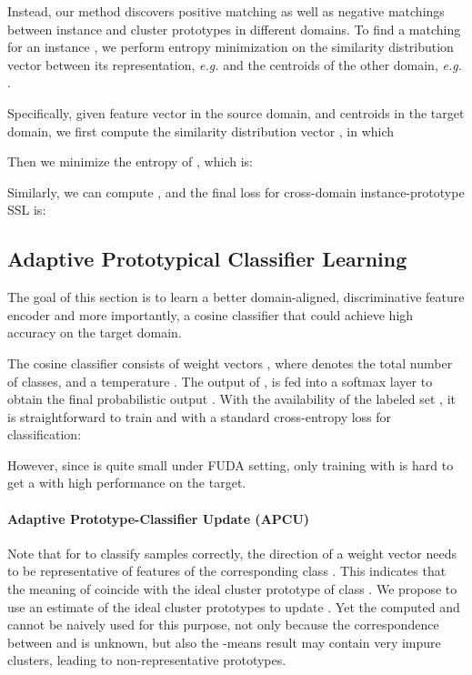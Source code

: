 \documentclass[final]{cvpr}
\begin{document}
Instead, our method discovers positive matching as well as negative matchings between instance and cluster prototypes in different domains. To find a matching for an instance , we perform entropy minimization on the similarity distribution vector between its representation, \textit{e.g.}  and the centroids of the other domain, \textit{e.g.} . 

Specifically, given feature vector  in the source domain, and centroids  in the target domain, we first compute the similarity distribution vector , in which 

Then we minimize the entropy of , which is:

Similarly, we can compute , and the final loss for cross-domain instance-prototype SSL is: 



\subsection{Adaptive Prototypical Classifier Learning}
The goal of this section is to learn a better domain-aligned, discriminative feature encoder  and more importantly, a cosine classifier  that could achieve high accuracy on the target domain. 

The cosine classifier  consists of weight vectors , where  denotes the total number of classes, and a temperature . The output of ,  is fed into a softmax layer  to obtain the final probabilistic output . With the availability of the labeled set , it is straightforward to train  and  with a standard cross-entropy loss for classification:

However, since  is quite small under FUDA setting, only training with  is hard to get a  with high performance on the target. 

\paragraph{Adaptive Prototype-Classifier Update (APCU)} Note that for  to classify samples correctly, the direction of a weight vector  needs to be representative of features of the corresponding class . This indicates that the meaning of  coincide with the ideal cluster prototype of class . We propose to use an estimate of the ideal cluster prototypes to update . Yet the computed  and  cannot be naively used for this purpose, not only because the correspondence between  and  is unknown, but also the -means result may contain very impure clusters, leading to non-representative prototypes. 
\end{document}
